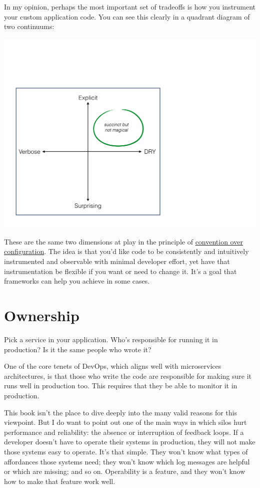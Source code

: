 \documentclass{vivid_layout}
\begin{document}
In my opinion, perhaps the most important set of tradeoffs is how you instrument
your custom application code. You can see this clearly in a quadrant diagram of two
continuums:
\begin{center}
\includegraphics[width=.85\linewidth]{architecture-monitoring/coc}
\end{center}

These are the same two dimensions at play in the principle of
\href{https://en.wikipedia.org/wiki/Convention\_over\_configuration}{convention
over configuration}. The idea is that you'd like code to be consistently and
intuitively instrumented and observable with minimal developer effort, yet have
that instrumentation be flexible if you want or need to change it.
It's a goal that frameworks can help you achieve in some cases.

\section{Ownership}

Pick a service in your application. Who's responsible for running it in
production? Is it the same people who wrote it?

One of the core tenets of DevOps, which aligns well with microservices
architectures, is that those who write the code are responsible for making sure
it runs well in production too. This requires that they be
able to monitor it in production.

This book isn't the place to dive deeply into the many valid reasons for this
viewpoint. But I do want to point out one of the main ways in which
silos hurt performance and reliability: the absence or interruption of feedback
loops. If a developer doesn't have to operate their systems in production, they
will not make those systems easy to operate. It's that simple. They won't know
what types of affordances those systems need; they won't know which log messages
are helpful or which are missing; and so on. Operability is a feature, and they
won't know how to make that feature work well.
\end{document}
